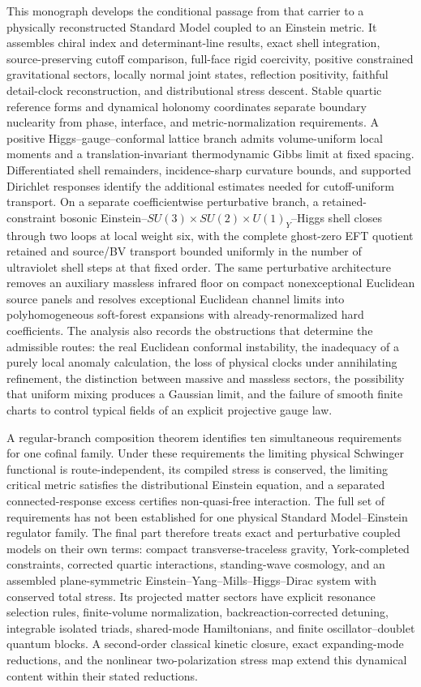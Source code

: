 \documentclass[11pt,a4paper,oneside]{book}
\theoremstyle{plain}
\theoremstyle{definition}
\theoremstyle{remark}
\begin{document}
This monograph develops the conditional passage from that carrier to a physically reconstructed Standard Model coupled to an Einstein metric. It assembles chiral index and determinant-line results, exact shell integration, source-preserving cutoff comparison, full-face rigid coercivity, positive constrained gravitational sectors, locally normal joint states, reflection positivity, faithful detail-clock reconstruction, and distributional stress descent. Stable quartic reference forms and dynamical holonomy coordinates separate boundary nuclearity from phase, interface, and metric-normalization requirements. A positive Higgs--gauge--conformal lattice branch admits volume-uniform local moments and a translation-invariant thermodynamic Gibbs limit at fixed spacing. Differentiated shell remainders, incidence-sharp curvature bounds, and supported Dirichlet responses identify the additional estimates needed for cutoff-uniform transport.  On a separate coefficientwise perturbative branch, a retained-constraint bosonic Einstein--$SU(3)\times SU(2)\times U(1)_Y$--Higgs shell closes through two loops at local weight six, with the complete ghost-zero EFT quotient retained and source/BV transport bounded uniformly in the number of ultraviolet shell steps at that fixed order.  The same perturbative architecture removes an auxiliary massless infrared floor on compact nonexceptional Euclidean source panels and resolves exceptional Euclidean channel limits into polyhomogeneous soft-forest expansions with already-renormalized hard coefficients. The analysis also records the obstructions that determine the admissible routes: the real Euclidean conformal instability, the inadequacy of a purely local anomaly calculation, the loss of physical clocks under annihilating refinement, the distinction between massive and massless sectors, the possibility that uniform mixing produces a Gaussian limit, and the failure of smooth finite charts to control typical fields of an explicit projective gauge law.

A regular-branch composition theorem identifies ten simultaneous requirements for one cofinal family. Under these requirements the limiting physical Schwinger functional is route-independent, its compiled stress is conserved, the limiting critical metric satisfies the distributional Einstein equation, and a separated connected-response excess certifies non-quasi-free interaction. The full set of requirements has not been established for one physical Standard Model--Einstein regulator family. The final part therefore treats exact and perturbative coupled models on their own terms: compact transverse-traceless gravity, York-completed constraints, corrected quartic interactions, standing-wave cosmology, and an assembled plane-symmetric Einstein--Yang--Mills--Higgs--Dirac system with conserved total stress. Its projected matter sectors have explicit resonance selection rules, finite-volume normalization, backreaction-corrected detuning, integrable isolated triads, shared-mode Hamiltonians, and finite oscillator--doublet quantum blocks. A second-order classical kinetic closure, exact expanding-mode reductions, and the nonlinear two-polarization stress map extend this dynamical content within their stated reductions.
\end{document}
